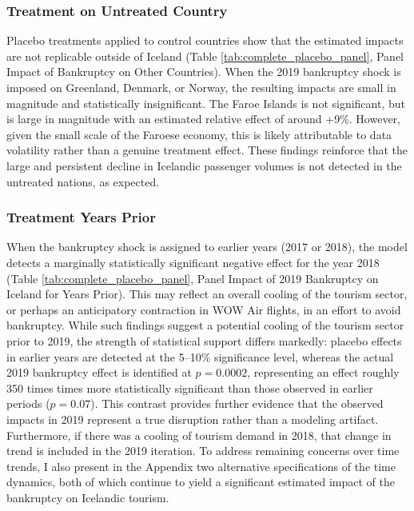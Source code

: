 \documentclass[12pt]{article}
\begin{document}
\subsubsection{Treatment on Untreated Country}\label{sec:Placebo2}

Placebo treatments applied to control countries show that the estimated impacts are not replicable outside of Iceland (Table \ref{tab:complete_placebo_panel}, Panel Impact of Bankruptcy on Other Countries). When the 2019 bankruptcy shock is imposed on Greenland, Denmark, or Norway, the resulting impacts are small in magnitude and statistically insignificant. The Faroe Islands is not significant, but is large in magnitude with an estimated relative effect of around +9\%. However, given the small scale of the Faroese economy, this is likely attributable to data volatility rather than a genuine treatment effect. These findings reinforce that the large and persistent decline in Icelandic passenger volumes is not detected in the untreated nations, as expected.

\subsubsection{Treatment Years Prior}\label{sec:Placebo3}

When the bankruptcy shock is assigned to earlier years (2017 or 2018), the model detects a marginally statistically significant negative effect for the year 2018 (Table \ref{tab:complete_placebo_panel}, Panel Impact of 2019 Bankruptcy on Iceland for Years Prior). This may reflect an overall cooling of the tourism sector, or perhaps an anticipatory contraction in WOW Air flights, in an effort to avoid bankruptcy. While such findings suggest a potential cooling of the tourism sector prior to 2019, the strength of statistical support differs markedly: placebo effects in earlier years are detected at the 5–10\% significance level, whereas the actual 2019 bankruptcy effect is identified at $p = 0.0002$, representing an effect roughly 350 times times more statistically significant than those observed in earlier periods ($p = 0.07$). This contrast provides further evidence that the observed impacts in 2019 represent a true disruption rather than a modeling artifact. Furthermore, if there was a cooling of tourism demand in 2018, that change in trend is included in the 2019 iteration. To address remaining concerns over time trends, I also present in the Appendix two alternative specifications of the time dynamics, both of which continue to yield a significant estimated impact of the bankruptcy on Icelandic tourism.
\end{document}
